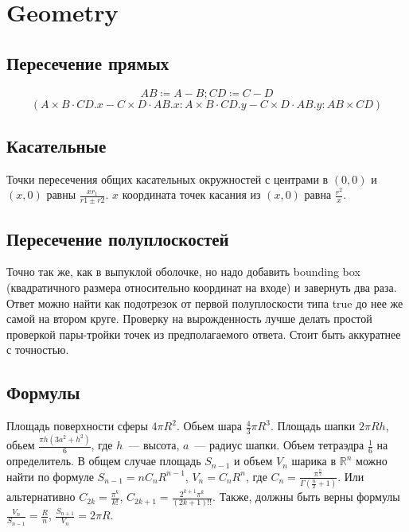 \section{Geometry}

\subsection{Пересечение прямых}

\begin{equation*}
	AB \coloneqq A - B; CD \coloneqq C - D
\end{equation*}
\begin{equation*}
	(A \times B \cdot CD.x - C \times D \cdot AB.x : A \times B \cdot CD.y - C \times D \cdot AB.y : AB \times CD)
\end{equation*}

\subsection{Касательные}

Точки пересечения общих касательных окружностей с центрами в $(0, 0)$ и $(x, 0)$ равны $\frac{x r_1}{r1 \pm r2}$.
$x$ координата точек касания из $(x, 0)$ равна $\frac{r^2}{x}$.

\subsection{Пересечение полуплоскостей}

Точно так же, как в выпуклой оболочке, но надо добавить bounding box (квадратичного размера относительно координат на входе) и завернуть два раза.
Ответ можно найти как подотрезок от первой полуплоскости типа true до нее же самой на втором круге.
Проверку на вырожденность лучше делать простой проверкой пары-тройки точек из предполагаемого ответа. Стоит быть аккуратнее с точностью.

\subsection{Формулы}

Площадь поверхности сферы $4 \pi R^2$. Обьем шара $\frac43 \pi R^3$. Площадь шапки $2 \pi R h$, обьем $\frac{\pi h (3a^2+h^2)}{6}$, где $h$~--- высота, $a$~--- радиус шапки. Объем тетраэдра $\frac16$ на определитель. В общем случае площадь $S_{n - 1}$ и объем $V_n$ шарика в $\mathbb{R}^n$ можно найти по формуле $S_{n - 1} = n C_n R^{n - 1}$, $V_n = C_n R^n$, где $C_n = \frac{\pi^{\frac{n}{2}}}{\Gamma(\frac{n}{2} + 1)}$. Или альтернативно $C_{2k} = \frac{\pi^k}{k!}$, $C_{2k + 1} = \frac{2^{k + 1} \pi^k}{(2k + 1)!!}$. Также, должны быть верны формулы $\frac{V_n}{S_{n - 1}} = \frac{R}{n}$, $\frac{S_{n + 1}}{V_n} = 2 \pi R$.
